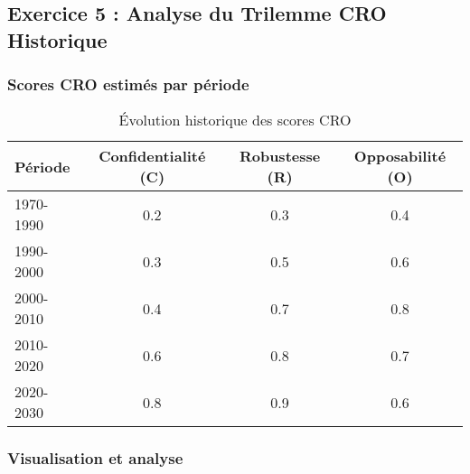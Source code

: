 \documentclass[12pt,a4paper]{article}
\begin{document}
\subsection{Exercice 5 : Analyse du Trilemme CRO Historique}

\subsubsection{Scores CRO estimés par période}

\begin{table}[H]
\centering
\begin{tabular}{|l|c|c|c|}
\hline
\textbf{Période} & \textbf{Confidentialité (C)} & \textbf{Robustesse (R)} & \textbf{Opposabilité (O)} \\
\hline
1970-1990 & 0.2 & 0.3 & 0.4 \\
1990-2000 & 0.3 & 0.5 & 0.6 \\
2000-2010 & 0.4 & 0.7 & 0.8 \\
2010-2020 & 0.6 & 0.8 & 0.7 \\
2020-2030 & 0.8 & 0.9 & 0.6 \\
\hline
\end{tabular}
\caption{Évolution historique des scores CRO}
\end{table}

\subsubsection{Visualisation et analyse}
\end{document}
